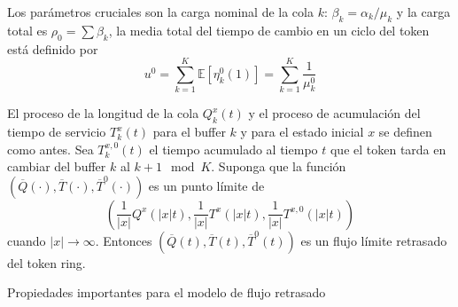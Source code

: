 \documentclass{article}
\newcommand{\esp}{\mathbb{E}}
\numberwithin{equation}{section}
\begin{document}
Los par\'ametros cruciales son la carga nominal de la cola $k$:
$\beta_{k}=\alpha_{k}/\mu_{k}$ y la carga total es
$\rho_{0}=\sum\beta_{k}$, la media total del tiempo de cambio en
un ciclo del token est\'a definido por
\begin{equation}
 u^{0}=\sum_{k=1}^{K}\esp\left[\eta_{k}^{0}\left(1\right)\right]=\sum_{k=1}^{K}\frac{1}{\mu_{k}^{0}}
\end{equation}

El proceso de la longitud de la cola $Q_{k}^{x}\left(t\right)$ y
el proceso de acumulaci\'on del tiempo de servicio
$T_{k}^{x}\left(t\right)$ para el buffer $k$ y para el estado
inicial $x$ se definen como antes. Sea $T_{k}^{x,0}\left(t\right)$
el tiempo acumulado al tiempo $t$ que el token tarda en cambiar
del buffer $k$ al $k+1\mod K$. Suponga que la funci\'on
$\left(\overline{Q}\left(\cdot\right),\overline{T}\left(\cdot\right),\overline{T}^{0}\left(\cdot\right)\right)$
es un punto l\'imite de
\begin{equation}\label{Eq.4.4}
\left(\frac{1}{|x|}Q^{x}\left(|x|t\right),\frac{1}{|x|}T^{x}\left(|x|t\right),\frac{1}{|x|}T^{x,0}\left(|x|t\right)\right)
\end{equation}
cuando $|x|\rightarrow\infty$. Entonces
$\left(\overline{Q}\left(t\right),\overline{T}\left(t\right),\overline{T}^{0}\left(t\right)\right)$
es un flujo l\'imite retrasado del token ring.

Propiedades importantes para el modelo de flujo retrasado
\end{document}
